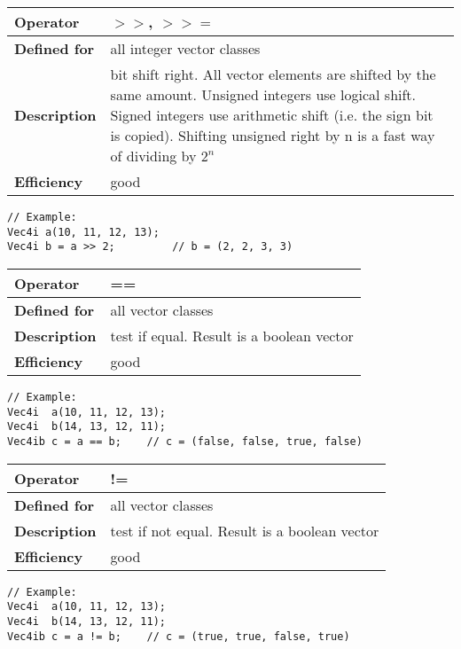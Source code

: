 \documentclass[vcl_manual.tex]{subfiles}
\begin{document}
\begin{tabular}{|p{25mm}|p{100mm}|}
\hline
\bfseries Operator & $>>$, $>>=$ \\ \hline
\bfseries Defined for & all integer vector classes \\ \hline
\bfseries Description & bit shift right. All vector elements are shifted by the same amount.\newline
Unsigned integers use logical shift. \newline
Signed integers use arithmetic shift (i.e. the sign bit is copied). \newline
Shifting unsigned right by n is a fast way of dividing by $2^n$ 
 \\ \hline
\bfseries Efficiency & good \\ \hline
\end{tabular}
\begin{lstlisting}[frame=none]
// Example:
Vec4i a(10, 11, 12, 13);
Vec4i b = a >> 2;         // b = (2, 2, 3, 3)
\end{lstlisting}


\begin{tabular}{|p{25mm}|p{100mm}|}
\hline
\bfseries Operator & == \\ \hline
\bfseries Defined for & all vector classes \\ \hline
\bfseries Description & test if equal. Result is a boolean vector \\ \hline
\bfseries Efficiency & good \\ \hline
\end{tabular}
\begin{lstlisting}[frame=none]
// Example:
Vec4i  a(10, 11, 12, 13);
Vec4i  b(14, 13, 12, 11);
Vec4ib c = a == b;    // c = (false, false, true, false)
\end{lstlisting}


\begin{tabular}{|p{25mm}|p{100mm}|}
\hline
\bfseries Operator & != \\ \hline
\bfseries Defined for & all vector classes \\ \hline
\bfseries Description & test if not equal. Result is a boolean vector \\ \hline
\bfseries Efficiency & good \\ \hline
\end{tabular}
\begin{lstlisting}[frame=none]
// Example:
Vec4i  a(10, 11, 12, 13);
Vec4i  b(14, 13, 12, 11);
Vec4ib c = a != b;    // c = (true, true, false, true)
\end{lstlisting}
\end{document}
